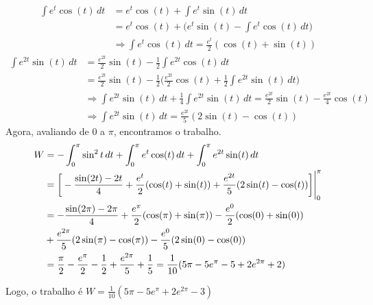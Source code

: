 \documentclass[../main.tex]{subfiles}
\begin{document}
\begin{solucao}
\begin{enumerate}[label=\alph*)]
			\begin{align*}
				\int e^t\cos(t)\, dt
				&= e^t\cos(t) +\int e^t\sin(t)\, dt\\
				&= e^t\cos(t) +\bigg(e^t\sin(t)-\int e^t\cos(t)\, dt\bigg)\\
				&\Rightarrow \int e^t \cos(t)\, dt= \frac{e^t}{2}(\cos(t)+\sin(t))
			\end{align*}
			\begin{align*}
				\int e^{2t}\sin(t)\, dt
				&= \frac{e^{2t}}{2}\sin(t)-\frac{1}{2}\int e^{2t}\cos(t)\, dt\\
				&= \frac{e^{2t}}{2}\sin(t)-\frac{1}{2}\bigg(\frac{e^{2t}}{2}\cos(t)+\frac{1}{2}\int e^{2t}\sin(t)\, dt\bigg)\\
				&\Rightarrow \int e^{2t}\sin(t)\, dt+\frac{1}{4}\int e^{2t}\sin(t)\, dt =\frac{e^{2t}}{2}\sin(t)-\frac{e^{2t}}{4}\cos(t)\\
				&\Rightarrow \int e^{2t}\sin(t)\, dt =\frac{e^{2t}}{5}(2\sin(t)-\cos(t))
			\end{align*}
			Agora, avaliando de $0$ a $\pi$, encontramos o trabalho.
			\begin{align*}
				W
				&= -\int_0^\pi \sin^2t\, dt +\int_0^\pi e^t\cos(t)\, dt +\int_0^\pi e^{2t}\sin(t)\, dt\\
				&= \bigg[-\frac{\sin(2t)-2t}{4} + \frac{e^t}{2}(\cos(t)+\sin(t))+\frac{e^{2t}}{5}(2\sin(t)-\cos(t))\bigg]\Biggr{|}_0^\pi\\
				&=-\frac{\sin(2\pi)-2\pi}{4} + \frac{e^\pi}{2}(\cos(\pi)+\sin(\pi))-\frac{e^0}{2}(\cos(0)+\sin(0))\\&+\frac{e^{2\pi}}{5}(2\sin(\pi)-\cos(\pi))-\frac{e^0}{5}(2\sin(0)-\cos(0))\\
				&=\frac{\pi}{2} - \frac{e^\pi}{2}-\frac{1}{2}+\frac{e^{2\pi}}{5}+\frac{1}{5}=\frac{1}{10}(5\pi-5e^\pi-5+2e^{2\pi}+2)
			\end{align*}
			
			Logo, o trabalho é $W = \frac{1}{10}(5\pi-5e^\pi+2e^{2\pi}-3)$
		\end{enumerate}
	\end{solucao}
	
\end{document}
